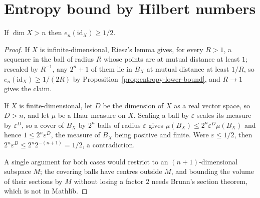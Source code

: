\section{Entropy bound by Hilbert numbers}
\label{sec:hilbert-entropy}

\begin{proposition}
\label{prop:entropy-identity}
\leanok
{}
If $\dim X > n$ then $e_n(\mathrm{id}_X) \ge 1/2$.
\end{proposition}
\begin{proof}
\leanok
If $X$ is infinite-dimensional, Riesz's lemma gives, for every $R > 1$, a sequence in
the ball of radius $R$ whose points are at mutual distance at least $1$; rescaled by
$R^{-1}$, any $2^n + 1$ of them lie in $B_X$ at mutual distance at least $1/R$, so
$e_n(\mathrm{id}_X) \ge 1/(2R)$ by Proposition~\ref{prop:entropy-lower-bound}, and
$R \to 1$ gives the claim.

If $X$ is finite-dimensional,
let $D$ be the dimension of $X$ as a real vector space, so $D > n$, and let
$\mu$ be a Haar measure on $X$. Scaling a ball by $\varepsilon$ scales its
measure by $\varepsilon^D$, so a cover of $B_X$ by $2^n$ balls of radius
$\varepsilon$ gives
$\mu(B_X) \le 2^n \varepsilon^D \mu(B_X)$ and hence
$1 \le 2^n \varepsilon^D$, the measure of $B_X$ being positive and finite.
Were $\varepsilon \le 1/2$, then
$2^n \varepsilon^D \le 2^n 2^{-(n+1)} = 1/2$, a contradiction.

A single argument for both cases would restrict to an $(n+1)$-dimensional subspace
$M$; the covering balls have centres outside $M$, and bounding the volume of their
sections by $M$ without losing a factor $2$ needs Brunn's section theorem, which is
not in Mathlib.
\end{proof}

